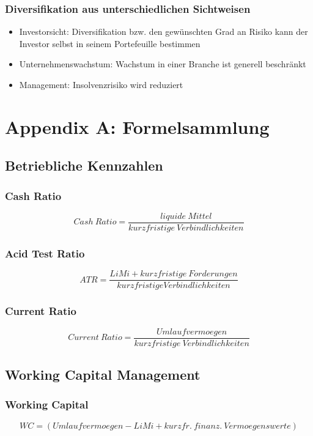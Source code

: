 \subsubsection{Diversifikation aus unterschiedlichen Sichtweisen}
\begin{itemize}
	\item Investorsicht: Diversifikation bzw. den gewünschten Grad an Risiko kann der Investor selbst in seinem Portefeuille bestimmen
	\item Unternehmenswachstum: Wachstum in einer Branche ist generell beschränkt
	\item Management: Insolvenzrisiko wird reduziert
\end{itemize}



\section{Appendix A: Formelsammlung}

\subsection{Betriebliche Kennzahlen}

\subsubsection{Cash Ratio}
\[Cash~Ratio = \frac{liquide~Mittel}{kurzfristige~Verbindlichkeiten}\]

\subsubsection{Acid Test Ratio}
\[ATR = \frac{LiMi + kurzfristige~Forderungen}{kurzfristige Verbindlichkeiten}\]

\subsubsection{Current Ratio}
\[Current~Ratio = \frac{Umlaufvermoegen}{kurzfristige~Verbindlichkeiten}\]


\subsection{Working Capital Management}

\subsubsection{Working Capital}
\[WC = (Umlaufvermoegen - LiMi + kurzfr.~finanz.~Vermoegenswerte)\]

